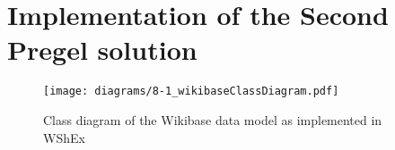\section{Implementation of the Second Pregel solution}

\begin{figure}[ht]
    \centering
    \texttt{[image: diagrams/8-1\_wikibaseClassDiagram.pdf]}
    \caption[Class diagram of the Wikibase data model as implemented in WShEx]{Class diagram of the Wikibase data model as implemented in WShEx\footnotemark}
    \label{fig:wikibaseClassDiagram}
\end{figure}
